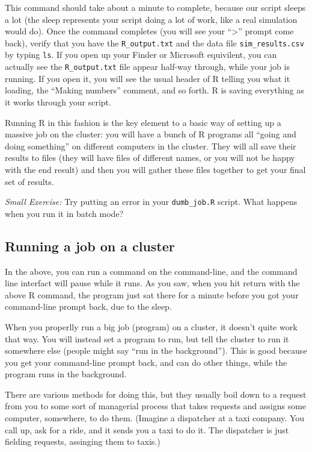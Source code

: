 \documentclass[
]{book}
\begin{document}
This command should take about a minute to complete, because our script sleeps a lot (the sleep represents your script doing a lot of work, like a real simulation would do).
Once the command completes (you will see your ``\textgreater{}'' prompt come back), verify that you have the \texttt{R\_output.txt} and the data file \texttt{sim\_results.csv} by typing \texttt{ls}.
If you open up your Finder or Microsoft equivilent, you can actually see the \texttt{R\_output.txt} file appear half-way through, while your job is running.
If you open it, you will see the usual header of R telling you what it loading, the ``Making numbers'' comment, and so forth.
R is saving everything as it works through your script.

Running R in this fashion is the key element to a basic way of setting up a massive job on the cluster: you will have a bunch of R programs all ``going and doing something'' on different computers in the cluster.
They will all save their results to files (they will have files of different names, or you will not be happy with the end result) and then you will gather these files together to get your final set of results.

\emph{Small Exercise:} Try putting an error in your \texttt{dumb\_job.R} script. What happens when you run it in batch mode?

\subsection{Running a job on a cluster}\label{running-a-job-on-a-cluster}

In the above, you can run a command on the command-line, and the command line interfact will pause while it runs.
As you saw, when you hit return with the above R command, the program just sat there for a minute before you got your command-line prompt back, due to the sleep.

When you properlly run a big job (program) on a cluster, it doesn't quite work that way.
You will instead set a program to run, but tell the cluster to run it somewhere else (people might say ``run in the background'').
This is good because you get your command-line prompt back, and can do other things, while the program runs in the background.

There are various methods for doing this, but they usually boil down to a request from you to some sort of managerial process that takes requests and assigns some computer, somewhere, to do them.
(Imagine a dispatcher at a taxi company. You call up, ask for a ride, and it sends you a taxi to do it. The dispatcher is just fielding requests, assinging them to taxis.)
\end{document}
